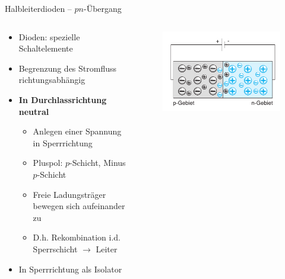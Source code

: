 \documentclass[12pt%
,aspectratio=169%
]{beamer}
\begin{document}
\begin{frame}{Halbleiterdioden -- $pn$-Übergang}
\begin{columns}[T] %
\begin{column}{.48\textwidth}
\begin{itemize}
	\item Dioden: spezielle Schaltelemente
	\item Begrenzung des Stromﬂuss richtungsabhängig
	\item \textbf{In Durchlassrichtung neutral}
	\begin{itemize}
		\item Anlegen einer Spannung in Sperrrichtung
		\item Pluspol: $p$-Schicht, Minus $p$-Schicht
		\item Freie Ladungsträger bewegen sich aufeinander zu
		\item D.h. Rekombination i.d. Sperrschicht $\to$ Leiter
	\end{itemize}
	\item In Sperrrichtung als Isolator
\end{itemize}
\end{column}%
\hfill%
\begin{column}{.48\textwidth}
\begin{figure}
\center
\includegraphics[scale=0.5]{pictures/durchlass}
\end{figure}
\end{column}%
\end{columns}
\end{frame}
\end{document}
